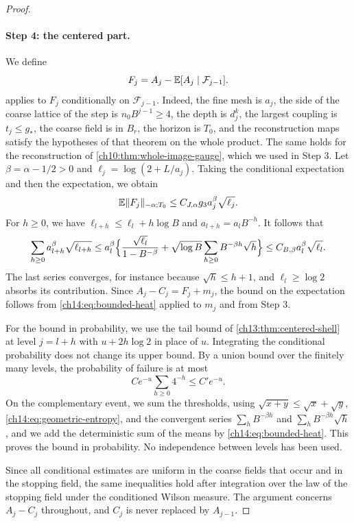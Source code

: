 \begin{proof}
\paragraph{Step 4: the centered part.}
We define
\[
 F_j=A_j-\mathbb E[A_j\mid\mathcal F_{j-1}].
\]
 applies to $F_j$ conditionally on $\mathcal F_{j-1}$. Indeed, the fine mesh is $a_j$, the side of the coarse lattice of the step is $n_0B^{j-1}\ge4$, the depth is $d_j^k$, the largest coupling is $t_j\le g_*$, the coarse field is in $B_r$, the horizon is $T_0$, and the reconstruction maps satisfy the hypotheses of that theorem on the whole product. The same holds for the reconstruction of \cref{ch10:thm:whole-image-gauge}, which we used in Step 3. Let $\beta=\alpha-1/2>0$ and $\ell_j=\log(2+L/a_j)$. Taking the conditional expectation and then the expectation, we obtain
\[
 \mathbb E\lVert F_j\rVert_{-\alpha;T_0}\le C_{J,\alpha}g_3a_j^\beta\sqrt{\ell_j}.
\]
For $h\ge0$, we have $\ell_{l+h}\le\ell_l+h\log B$ and $a_{l+h}=a_lB^{-h}$. It follows that
\begin{equation}\label{ch14:eq:geometric-entropy}
 \sum_{h\ge0}a_{l+h}^\beta\sqrt{\ell_{l+h}}
 \le a_l^\beta\Bigl\{\frac{\sqrt{\ell_l}}{1-B^{-\beta}}+\sqrt{\log B}\sum_{h\ge0}B^{-\beta h}\sqrt h\Bigr\}
 \le C_{B,\beta}a_l^\beta\sqrt{\ell_l}.
\end{equation}
The last series converges, for instance because $\sqrt h\le h+1$, and $\ell_l\ge\log2$ absorbs its contribution. Since $A_j-C_j=F_j+m_j$, the bound on the expectation follows from \eqref{ch14:eq:bounded-heat} applied to $m_j$ and from Step 3.

For the bound in probability, we use the tail bound of \cref{ch13:thm:centered-shell} at level $j=l+h$ with $u+2h\log2$ in place of $u$. Integrating the conditional probability does not change its upper bound. By a union bound over the finitely many levels, the probability of failure is at most
\[
 Ce^{-u}\sum_{h\ge0}4^{-h}\le C'e^{-u}.
\]
On the complementary event, we sum the thresholds, using $\sqrt{x+y}\le\sqrt x+\sqrt y$, \eqref{ch14:eq:geometric-entropy}, and the convergent series $\sum_hB^{-\beta h}$ and $\sum_hB^{-\beta h}\sqrt h$, and we add the deterministic sum of the means by \eqref{ch14:eq:bounded-heat}. This proves the bound in probability. No independence between levels has been used.

Since all conditional estimates are uniform in the coarse fields that occur and in the stopping field, the same inequalities hold after integration over the law of the stopping field under the conditioned Wilson measure. The argument concerns $A_j-C_j$ throughout, and $C_j$ is never replaced by $A_{j-1}$.
\end{proof}

